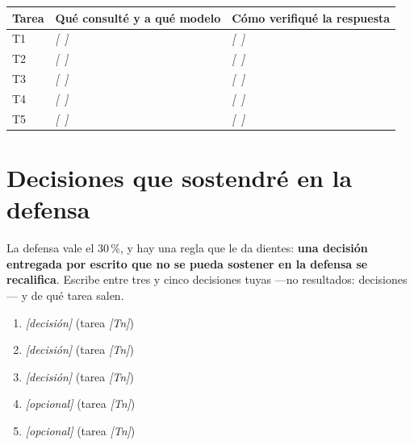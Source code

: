 \documentclass[11pt,a4paper,oneside]{article}
\newcommand{\marcador}[1]{\textcolor{grismarcador}{\textit{[#1]}}}
\begin{document}
\vspace{0.3cm}
\renewcommand{\arraystretch}{1.4}
\begingroup\setlength{\parskip}{0pt}
\begin{tabularx}{\textwidth}{@{}l X X@{}}
\toprule
\textbf{Tarea} & \textbf{Qué consulté y a qué modelo} & \textbf{Cómo verifiqué la respuesta} \\
\midrule
T1 & \marcador{~} & \marcador{~} \\
T2 & \marcador{~} & \marcador{~} \\
T3 & \marcador{~} & \marcador{~} \\
T4 & \marcador{~} & \marcador{~} \\
T5 & \marcador{~} & \marcador{~} \\
\bottomrule
\end{tabularx}
\endgroup

\section{Decisiones que sostendré en la defensa}

La defensa vale el 30\,\%, y hay una regla que le da dientes: \textbf{una decisión entregada por
escrito que no se pueda sostener en la defensa se recalifica}. Escribe entre tres y cinco
decisiones tuyas —no resultados: decisiones— y de qué tarea salen.

\begin{enumerate}[leftmargin=*,itemsep=4pt]
  \item \marcador{decisión} \hfill \textcolor{grismarcador}{\small (tarea \marcador{Tn})}
  \item \marcador{decisión} \hfill \textcolor{grismarcador}{\small (tarea \marcador{Tn})}
  \item \marcador{decisión} \hfill \textcolor{grismarcador}{\small (tarea \marcador{Tn})}
  \item \marcador{opcional} \hfill \textcolor{grismarcador}{\small (tarea \marcador{Tn})}
  \item \marcador{opcional} \hfill \textcolor{grismarcador}{\small (tarea \marcador{Tn})}
\end{enumerate}

\newpage
\end{document}
